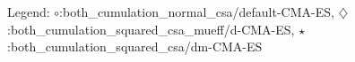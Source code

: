 Legend: {\color{CornflowerBlue}$\circ$}:both\_cumulation\_normal\_csa/default-CMA-ES, {\color{Orange}$\diamondsuit$}:both\_cumulation\_squared\_csa\_mueff/d-CMA-ES, {\color{Green}$\star$}:both\_cumulation\_squared\_csa/dm-CMA-ES